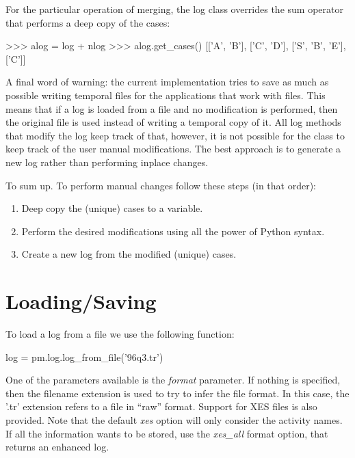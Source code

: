 \documentclass[a4paper,10pt]{book}
\begin{document}
For the particular operation of merging, the log class overrides the sum operator that performs a deep copy of the cases:\\
\begin{pycode}
>>> alog = log + nlog
>>> alog.get_cases()
[['A', 'B'], ['C', 'D'], ['S', 'B', 'E'], ['C']]
\end{pycode}

A final word of warning: the current implementation tries to save as much as possible writing temporal files for the applications that work with files. This means that if a log is loaded from a file and no modification is performed, then the original file is used instead of writing a temporal copy of it. All log methods that modify the log keep track of that, however, it is not possible for the class to keep track of the user manual modifications. The best approach is to generate a new log rather than performing inplace changes.

To sum up. To perform manual changes follow these steps (in that order):
\begin{enumerate}
 \item Deep copy the (unique) cases to a variable.
 \item Perform the desired modifications using all the power of Python syntax.
 \item Create a new log from the modified (unique) cases.
\end{enumerate}

\section{Loading/Saving}
\label{sec:log.load}
To load a log from a file we use the following function:\\
\begin{pycode}
log = pm.log.log_from_file('96q3.tr')
\end{pycode}

One of the parameters available is the \emph{format} parameter. If nothing is specified, then the filename extension is used to try to infer the file format. In this case, the '.tr' extension refers to a file in ``raw'' format. Support for XES files is also provided. Note that the default \emph{xes} option will only consider the activity names. If all the information wants to be stored, use the \emph{xes\_all} format option, that returns an enhanced log.
\end{document}
